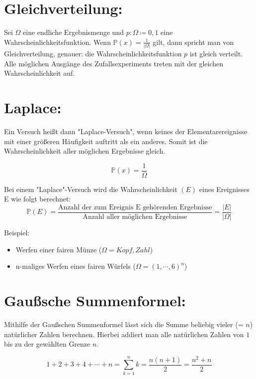 \documentclass[../main.tex]{subfiles}
\begin{document}
    \section{Gleichverteilung:}

    Sei \(\Omega\) eine endliche Ergebnismenge und \(p : \Omega \coloneqq {0, 1}\) eine Wahrscheinlichkeitsfunktion.
    Wenn \( \mathbb{P}(x) = \frac{1}{|\Omega|}\) gilt, dann spricht man von Gleichverteilung,
    genauer: die Wahrscheinlichkeitsfunktion \(p\) ist gleich verteilt.
    Alle möglichen Ausgänge des Zufallsexperiments treten mit der gleichen Wahrscheinlichkeit auf.


    \section{Laplace:}

    Ein Versuch heißt dann "Laplace-Versuch", wenn keines der Elementarereignisse mit einer größeren
    Häufigkeit auftritt als ein anderes.
    Somit ist die Wahrscheinlichkeit aller möglichen Ergebnisse gleich.

    \[\mathbb{P}(x)= \frac{1}{\Omega}\]

    Bei einem "Laplace"-Versuch wird die Wahrscheinlichkeit \((E)\) eines Ereignisses E wie folgt berechnet:
    \[\mathbb{P}(E)= \frac{\text{Anzahl der zum Ereignis E gehörenden Ergebnisse}} {\text{Anzahl aller möglichen Ergebnisse}} = \frac{|E|} {|\Omega|}\]


    Beispiel:
    \begin{itemize}
        \item Werfen einer fairen Münze (\(\Omega= {Kopf, Zahl}\))
    \end{itemize}
    \begin{itemize}
        \item n-maliges Werfen eines fairen Würfels (\(\Omega=({1,\cdots,6}) ^n\))
    \end{itemize}


    \section{Gaußsche Summenformel: }

    Mithilfe der Gaußschen Summenformel lässt sich die Summe beliebig vieler (= \(n\)) natürlicher Zahlen berechnen.
    Hierbei addiert man alle natürlichen Zahlen von \(1\) bis zu der gewählten Grenze \(n\).

    \[1 +2 +3+ 4+ \cdots +n = \sum \limits_{k=1}^{n} k = \frac{n(n+1)}{2} = \frac {n^{2}+n}{2}\]
\end{document}

